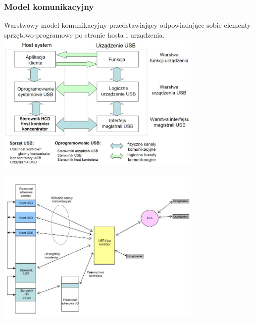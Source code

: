 		\subsubsection{Model komunikacyjny}
		Warstwowy model komunikacyjny przedstawiający odpowiadające sobie elementy sprzętowo-programowe po stronie hosta i urządzenia.
		\includegraphics[width=10cm]{./wyklady/USB_12_1.jpg}\\\\
		\includegraphics[width=10cm]{./wyklady/USB_13_1.jpg}\\
